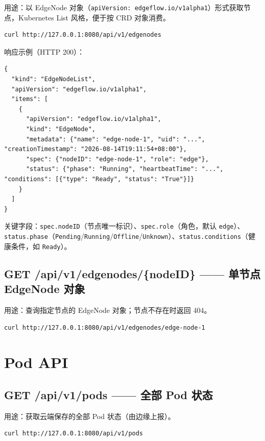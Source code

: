 用途：以 EdgeNode 对象（\texttt{apiVersion: edgeflow.io/v1alpha1}）形式获取节点，Kubernetes List 风格，便于按 CRD 对象消费。

\begin{lstlisting}
curl http://127.0.0.1:8080/api/v1/edgenodes
\end{lstlisting}

响应示例（HTTP 200）：

\begin{lstlisting}
{
  "kind": "EdgeNodeList",
  "apiVersion": "edgeflow.io/v1alpha1",
  "items": [
    {
      "apiVersion": "edgeflow.io/v1alpha1",
      "kind": "EdgeNode",
      "metadata": {"name": "edge-node-1", "uid": "...", "creationTimestamp": "2026-08-14T19:11:54+08:00"},
      "spec": {"nodeID": "edge-node-1", "role": "edge"},
      "status": {"phase": "Running", "heartbeatTime": "...", "conditions": [{"type": "Ready", "status": "True"}]}
    }
  ]
}
\end{lstlisting}

关键字段：\texttt{spec.nodeID}（节点唯一标识）、\texttt{spec.role}（角色，默认 \texttt{edge}）、\texttt{status.phase}（\texttt{Pending}/\texttt{Running}/\texttt{Offline}/\texttt{Unknown}）、\texttt{status.conditions}（健康条件，如 \texttt{Ready}）。

\subsection{GET /api/v1/edgenodes/\{nodeID\} —— 单节点 EdgeNode 对象}

用途：查询指定节点的 EdgeNode 对象；节点不存在时返回 404。

\begin{lstlisting}
curl http://127.0.0.1:8080/api/v1/edgenodes/edge-node-1
\end{lstlisting}

\section{Pod API}

\subsection{GET /api/v1/pods —— 全部 Pod 状态}

用途：获取云端保存的全部 Pod 状态（由边缘上报）。

\begin{lstlisting}
curl http://127.0.0.1:8080/api/v1/pods
\end{lstlisting}

